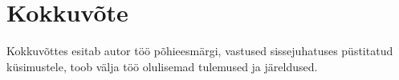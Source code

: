 \documentclass[a4paper,12pt]{article}
\begin{document}
\clearpage\vspace*{0pt}


\section{Kokkuvõte}
Kokkuvõttes esitab autor töö põhieesmärgi, vastused sissejuhatuses püstitatud
küsimustele, toob välja töö olulisemad tulemused ja järeldused.

\clearpage\vspace*{0pt}


\renewcommand{\baselinestretch}{1.15}
\small



\end{document}
